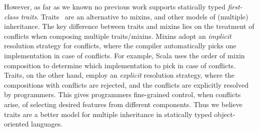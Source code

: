 However, as far as we known no previous work supports statically typed
\emph{first-class traits}. Traits~\citep{scharli2003traits, Ducasse_2006} are an
alternative to mixins, and other models of (multiple) inheritance. The key
difference between traits and mixins lies on the treatment of conflicts when
composing multiple traits/mixins. Mixins adopt an \emph{implicit} resolution
strategy for conflicts, where the compiler automatically picks one
implementation in case of conflicts. For example, Scala uses the order of mixin
composition to determine which implementation to pick in case of conflicts.
Traits, on the other hand, employ an \emph{explicit} resolution strategy, where
the compositions with conflicts are rejected, and the conflicts are explicitly
resolved by programmers. This gives programmers fine-grained control, when
conflicts arise, of selecting desired features from different components. Thus
we believe traits are a better model for multiple inheritance in
statically typed object-oriented languages.







